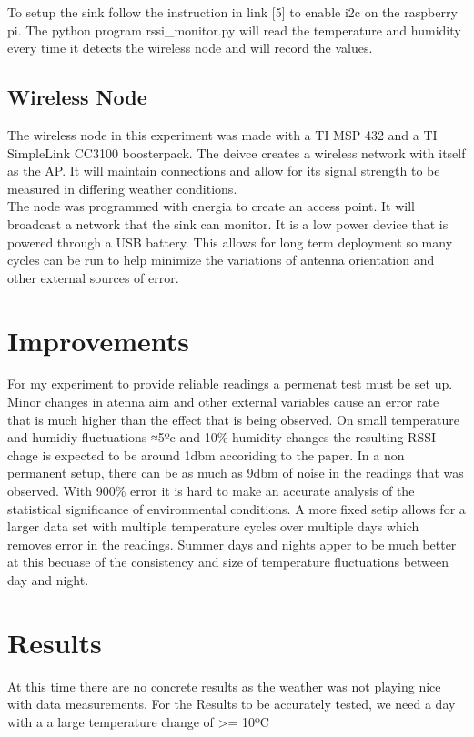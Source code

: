 \documentclass{article}
\begin{document}
To setup the sink follow the instruction in link [5] to enable i2c on the raspberry pi. The python program rssi\_monitor.py will read the temperature and humidity every time it detects the wireless node and will record the values.
\subsection{Wireless Node}
The wireless node in this experiment was made with a TI MSP 432 and a TI SimpleLink CC3100 boosterpack. The deivce creates a wireless network with itself as the AP. It will maintain connections and allow for its signal strength to be measured in differing weather conditions.\\

The node was programmed with energia to create an access point. It will broadcast a network that the sink can monitor. It is a low power device that is powered through a USB battery. This allows for long term deployment so many cycles can be run to help minimize the variations of antenna orientation and other external sources of error.


\section{Improvements}
For my experiment to provide reliable readings a permenat test must be set up. Minor changes in atenna aim and other external variables cause an error rate that is much higher than the effect that is being observed.
On small temperature and humidiy fluctuations ≈5ºc and 10\% humidity changes the resulting RSSI chage is expected to be around 1dbm accoriding to the paper. In a non permanent setup, there can be as much as 9dbm of noise in the readings that was observed. With 900\% error it is hard to make an accurate analysis of the statistical significance of environmental conditions.
A more fixed setip allows for a larger data set with multiple temperature cycles over multiple days which removes error in the readings. Summer days and nights apper to be much better at this becuase of the consistency and size of temperature fluctuations between day and night.
\section{Results}
At this time there are no concrete results as the weather was not playing nice with data measurements. For the Results to be accurately tested, we need a day with a a large temperature change of >= 10ºC
\end{document}

